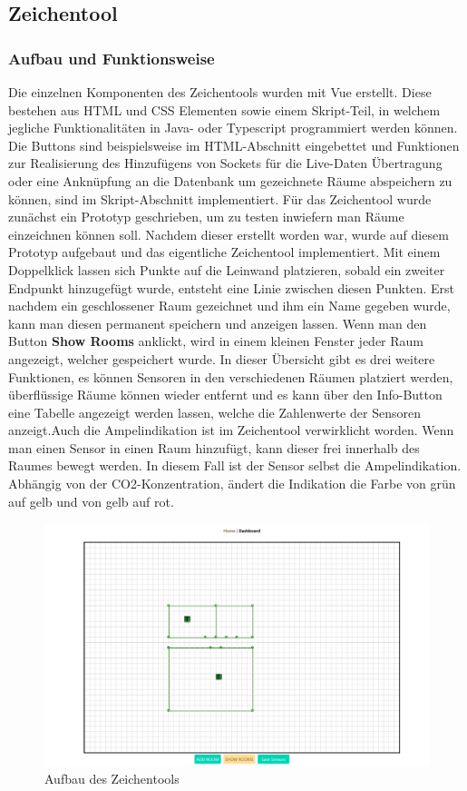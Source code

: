 \documentclass[]{article}
\begin{document}
			
			\subsection{Zeichentool}
				\subsubsection{Aufbau und Funktionsweise}
				Die einzelnen Komponenten des Zeichentools wurden mit Vue erstellt. Diese bestehen aus HTML und CSS Elementen sowie einem Skript-Teil, in welchem jegliche Funktionalitäten in Java- oder Typescript programmiert werden können. Die Buttons sind beispielsweise im HTML-Abschnitt eingebettet und Funktionen zur Realisierung des Hinzufügens von Sockets für die Live-Daten Übertragung oder eine Anknüpfung an die Datenbank um gezeichnete Räume abspeichern zu können, sind im Skript-Abschnitt implementiert. 
				Für das Zeichentool wurde zunächst ein Prototyp geschrieben, um zu testen inwiefern man Räume einzeichnen können soll. Nachdem dieser erstellt worden war, wurde auf diesem Prototyp aufgebaut und das eigentliche Zeichentool implementiert. Mit einem Doppelklick lassen sich Punkte auf die Leinwand platzieren, sobald ein zweiter Endpunkt hinzugefügt wurde, entsteht eine Linie zwischen diesen Punkten. Erst nachdem ein geschlossener Raum gezeichnet und ihm ein Name gegeben wurde, kann man diesen permanent speichern und anzeigen lassen. Wenn man den Button \textbf{Show Rooms} anklickt, wird in einem kleinen Fenster jeder Raum angezeigt, welcher gespeichert wurde. In dieser Übersicht gibt es drei weitere Funktionen, es können Sensoren in den verschiedenen Räumen platziert werden, überflüssige Räume können wieder entfernt und es kann über den Info-Button eine Tabelle angezeigt werden lassen, welche die Zahlenwerte der Sensoren anzeigt.\newline Auch die Ampelindikation ist im Zeichentool verwirklicht worden. Wenn man einen Sensor in einen Raum hinzufügt, kann dieser frei innerhalb des Raumes bewegt werden. In diesem Fall ist der Sensor selbst die Ampelindikation. Abhängig von der CO2-Konzentration, ändert die Indikation die Farbe von grün auf gelb und von gelb auf rot. 

				\begin{figure}[h]
					\centering
					\includegraphics[scale=0.50]{images/Zeichentoolbild}
					\caption{Aufbau des Zeichentools}
					\label{img:Zeichentoolbild}
				\end{figure}
				\newpage
\end{document}
